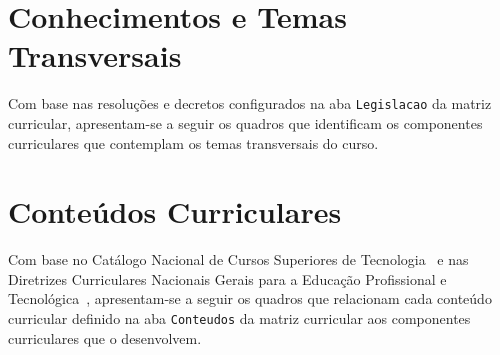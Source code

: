 \section{Conhecimentos e Temas Transversais}
\label{sec:temas_transversais}

Com base nas resoluções e decretos configurados na aba \texttt{Legislacao} da matriz curricular, apresentam-se a seguir os quadros que identificam os componentes curriculares que contemplam os temas transversais do curso.


\section{Conteúdos Curriculares}

Com base no Catálogo Nacional de Cursos Superiores de Tecnologia~\cite{mec_cncst_2024} e nas Diretrizes Curriculares Nacionais Gerais para a Educação Profissional e Tecnológica~\cite{cne_cp_1_2021}, apresentam-se a seguir os quadros que relacionam cada conteúdo curricular definido na aba \texttt{Conteudos} da matriz curricular aos componentes curriculares que o desenvolvem.

